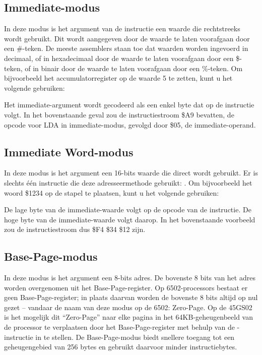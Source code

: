 \subsection{Immediate-modus}

In deze modus is het argument van de instructie een waarde die rechtstreeks wordt gebruikt. Dit wordt aangegeven door de waarde te laten voorafgaan door een \#-teken. De meeste assemblers staan toe dat waarden worden ingevoerd in decimaal, of in hexadecimaal door de waarde te laten voorafgaan door een \$-teken, of in binair door de waarde te laten voorafgaan door een \%-teken. Om bijvoorbeeld het accumulatorregister op de waarde 5 te zetten, kunt u het volgende gebruiken:


Het immediate-argument wordt gecodeerd als een enkel byte dat op de instructie volgt. In het bovenstaande geval zou de instructiestroom \$A9 bevatten, de opcode voor LDA in immediate-modus, gevolgd door \$05, de immediate-operand.

\subsection{Immediate Word-modus}

In deze modus is het argument een 16-bits waarde die direct wordt gebruikt. Er is slechts één instructie die deze adresseermethode gebruikt: . Om bijvoorbeeld het woord \$1234 op de stapel te plaatsen, kunt u het volgende gebruiken:


De lage byte van de immediate-waarde volgt op de opcode van de instructie. De hoge byte van de immediate-waarde volgt daarop. In het bovenstaande voorbeeld zou de instructiestroom dus \$F4 \$34 \$12 zijn.

\subsection{Base-Page-modus}
\label{Base-Page (Zero-Page) Mode}

In deze modus is het argument een 8-bits adres. De bovenste 8 bits van het adres worden overgenomen uit het Base-Page-register. Op 6502-processors bestaat er geen Base-Page-register; in plaats daarvan worden de bovenste 8 bits altijd op nul gezet -- vandaar de naam van deze modus op de 6502: Zero-Page. Op de 45GS02 is het mogelijk dit ``Zero-Page'' naar elke pagina in het 64KB-geheugenbeeld van de processor te verplaatsen door het Base-Page-register met behulp van de -instructie in te stellen. De Base-Page-modus biedt snellere toegang tot een geheugengebied van 256 bytes en gebruikt daarvoor minder instructiebytes.

